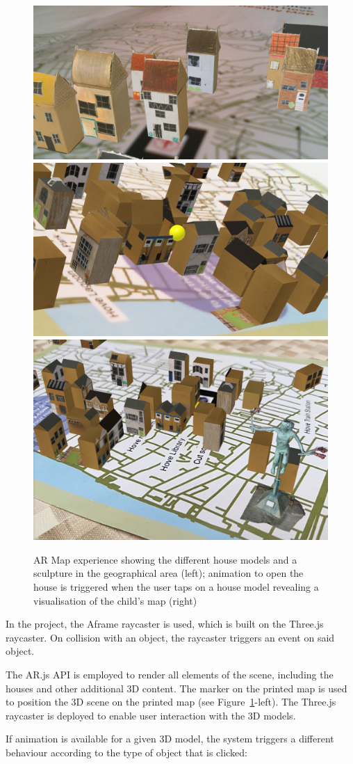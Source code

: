 \documentclass[acmlarge,screen,dvipsnames]{acmart}
\begin{document}
\begin{figure}[h] \centering
\includegraphics[width=0.48\linewidth]{images/photogrammetryAR.png}
\includegraphics[width=0.48\linewidth]{images/animationARexperience_zoom.png}\\
\includegraphics[width=0.48\linewidth]{images/ARcontentw_sculpture.png}
\caption{AR Map experience showing the different house models and a sculpture in the geographical area (left); animation to open the house is triggered when the user taps on a house model revealing a visualisation
 of the child's map (right)} \label{fig:ARexperience}
\end{figure}
 
In the project, the Aframe raycaster is used, which is built
on the Three.js raycaster. On collision with an object, the raycaster triggers
an event on said object. 

The AR.js API is employed to render all elements of the scene, including the
houses and other additional 3D content. The marker on the printed map is used
to position the 3D scene on the printed map (see
Figure~\ref{fig:ARexperience}-left). The Three.js raycaster is deployed to enable user interaction with
the 3D models. 

\color{black}
If animation is available for a given 3D model, the system triggers a different
behaviour according to the type of object that is clicked: 
\end{document}

